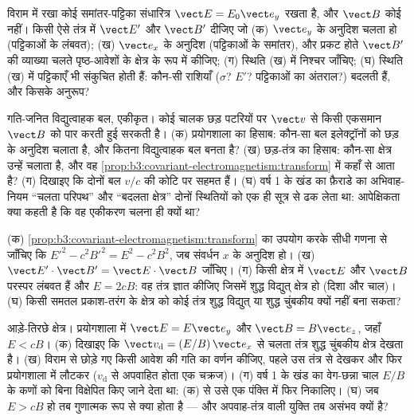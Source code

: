 \begin{exercise}[$\star$]\label{exo:b3:covariant-electromagnetism:4}
विराम में रखा कोई समांतर-पट्टिका संधारित्र $\vect E = E_0\vect e_y$
रखता है, और $\vect B$ कोई नहीं। किसी ऐसे तंत्र में $\vect E'$ और
$\vect B'$ दीजिए जो (क) $\vect e_y$ के अनुदिश चलता हो (पट्टिकाओं के
लंबवत); (ख) $\vect
e_x$ के अनुदिश (पट्टिकाओं के समांतर), और प्रकट होते $\vect B'$ की
व्याख्या चलते पृष्ठ-आवेशों के क्षेत्र के रूप में कीजिए; (ग) स्थिति (ख)
में निश्चर जाँचिए; (घ) स्थिति (ख) में पट्टिकाएँ भी संकुचित होती हैं:
कौन-सी राशियाँ ($\sigma$? $E'$? पट्टिकाओं का अंतराल?) बदलती हैं, और
किसके अनुरूप?
\end{exercise}

\begin{exercise}[$\star\star$]\label{exo:b3:covariant-electromagnetism:5}
गति-जनित विद्युत्वाहक बल, एकीकृत। कोई चालक छड़ पटरियों पर $\vect v$ से
किसी एकसमान $\vect B$ को पार करती हुई सरकती है। (क) प्रयोगशाला का हिसाब:
कौन-सा बल इलेक्ट्रॉनों को छड़ के अनुदिश चलाता है, और कितना
विद्युत्वाहक बल बनता है? (ख) छड़-तंत्र का हिसाब:
कौन-सा क्षेत्र उन्हें चलाता है, और वह
\cref{prop:b3:covariant-electromagnetism:transform} में कहाँ से आता
है? (ग) दिखाइए कि दोनों बल $v/c$ की कोटि पर सहमत हैं। (घ) वर्ष 1 के
खंड का फ़ैराडे का अभिवाह-नियम ``चलता परिपथ'' और ``बदलता क्षेत्र''
दोनों स्थितियों को एक ही सूत्र से ढक लेता था: आपेक्षिकता क्या कहती है
कि वह एकीकरण चलना ही क्यों था?
\end{exercise}

\begin{exercise}[$\star\star$]\label{exo:b3:covariant-electromagnetism:6}
(क) \cref{prop:b3:covariant-electromagnetism:transform} का उपयोग करके
सीधी गणना से जाँचिए कि $E'^2 - c^2B'^2 = E^2 - c^2B^2$, जब संवर्धन
$x$ के अनुदिश हो। (ख) $\vect E'\cdot\vect B' = \vect
E\cdot\vect B$ जाँचिए। (ग) किसी क्षेत्र में $\vect E$ और $\vect B$
परस्पर लंबवत हैं और $E = 2cB$: वह तंत्र ज्ञात कीजिए जिसमें शुद्ध
विद्युत् क्षेत्र हो (दिशा और चाल)। (घ) किसी समतल प्रकाश-तरंग के
क्षेत्र को कोई तंत्र शुद्ध विद्युत् या शुद्ध चुंबकीय क्यों नहीं बना सकता?
\end{exercise}

\begin{exercise}[$\star\star$]\label{exo:b3:covariant-electromagnetism:7}
आड़े-तिरछे क्षेत्र। प्रयोगशाला में $\vect E = E\vect e_y$ और $\vect B =
B\vect e_z$, जहाँ $E < cB$। (क) दिखाइए कि
$\vect v_{\text{d}} = (E/B)\,\vect e_x$ से चलता तंत्र शुद्ध चुंबकीय क्षेत्र देखता है।
(ख) विराम से छोड़े गए किसी आवेश की गति का वर्णन कीजिए, पहले उस तंत्र
से देखकर और फिर प्रयोगशाला में लौटकर ($v_{\text{d}}$ से अपवाहित होता
एक चक्रज)। (ग)
वर्ष 1 के खंड का वेग-छन्ना चाल $E/B$ के कणों को बिना विक्षेपित किए
जाने देता था: (क) से उसे एक पंक्ति में फिर निकालिए। (घ) जब
$E > cB$ हो तब गुणात्मक रूप से क्या होता है --- और अपवाह-तंत्र वाली
युक्ति तब असंभव क्यों है?
\end{exercise}


